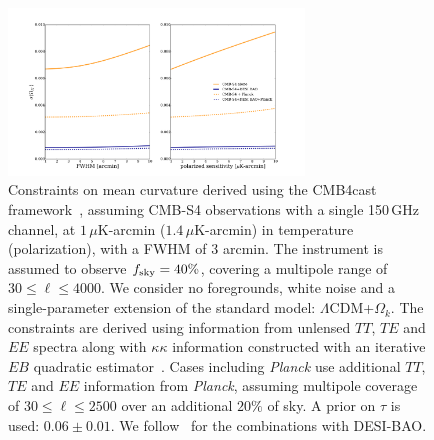 \begin{figure}[h!]
\centering \includegraphics[width=0.70\textwidth]{Inflation/OmK_vs_FWHM_or_uK_arcmin.pdf}
\caption{Constraints on mean curvature derived using the CMB4cast framework~\cite{Errard:2015cxa}, assuming CMB-S4 observations with a single 150\,GHz channel, at $1\,\mu$K-arcmin ($1.4\,\mu$K-arcmin) in temperature (polarization), with a FWHM of 3 arcmin. The instrument is assumed to observe $f_{\rm sky} = 40\%$, covering a multipole range of $30\leq\ell\leq 4000$.
We consider no foregrounds, white noise and a single-parameter extension of the standard model: $\Lambda$CDM+$\Omega_k$. 
The constraints are derived using information from unlensed $TT$, $TE$ and $EE$ spectra along with $\kappa\kappa$ information constructed with an iterative $EB$ quadratic estimator~\cite{Hirata:2002jy,Smith:2010gu}. Cases including {\it Planck\/} use additional $TT$, $TE$ and $EE$ information from {\it Planck}, assuming multipole coverage of $30\leq\ell\leq 2500$ over an additional $20\%$ of sky. A prior on $\tau$ is used: $0.06\pm0.01$. We follow~\cite{Wu:2014hta} for the combinations with DESI-BAO.}
\label{fig:OmK_vs_FWHM_or_uK_arcmin}
\end{figure}


